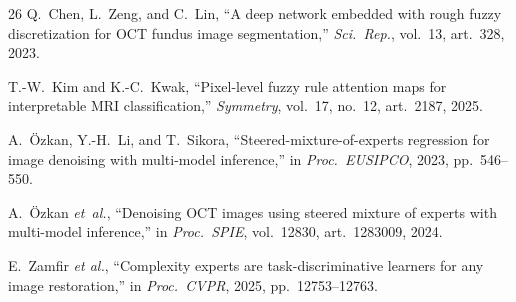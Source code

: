 \begin{thebibliography}{26}
Q.~Chen, L.~Zeng, and C.~Lin, ``A deep network embedded with rough fuzzy discretization for OCT fundus image segmentation,'' \emph{Sci.\ Rep.}, vol.~13, art.~328, 2023.

T.-W.~Kim and K.-C.~Kwak, ``Pixel-level fuzzy rule attention maps for interpretable MRI classification,'' \emph{Symmetry}, vol.~17, no.~12, art.~2187, 2025.

A.~\"Ozkan, Y.-H.~Li, and T.~Sikora, ``Steered-mixture-of-experts regression for image denoising with multi-model inference,'' in \emph{Proc.\ EUSIPCO}, 2023, pp.~546--550.

A.~\"Ozkan \emph{et~al.}, ``Denoising OCT images using steered mixture of experts with multi-model inference,'' in \emph{Proc.\ SPIE}, vol.~12830, art.~1283009, 2024.

E.~Zamfir \emph{et al.}, ``Complexity experts are task-discriminative learners for any image restoration,'' in \emph{Proc.\ CVPR}, 2025, pp.~12753--12763.

\end{thebibliography}
